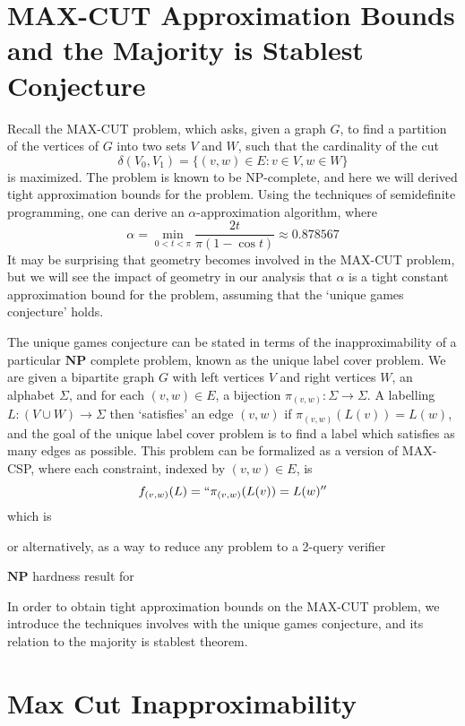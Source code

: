 \section{MAX-CUT Approximation Bounds and the Majority is Stablest Conjecture}

Recall the MAX-CUT problem, which asks, given a graph $G$, to find a partition of the vertices of $G$ into two sets $V$ and $W$, such that the cardinality of the cut
%
\[ \delta(V_0,V_1) = \{ (v,w) \in E : v \in V, w \in W \} \]
%
is maximized. The problem is known to be NP-complete, and here we will derived tight approximation bounds for the problem. Using the techniques of semidefinite programming, one can derive an $\alpha$-approximation algorithm, where
%
\[ \alpha = \min_{0 < t < \pi} \frac{2t}{\pi (1 - \cos t)} \approx 0.878567 \]
%
It may be surprising that geometry becomes involved in the MAX-CUT problem, but we will see the impact of geometry in our analysis that $\alpha$ is a tight constant approximation bound for the problem, assuming that the `unique games conjecture' holds.

The unique games conjecture can be stated in terms of the inapproximability of a particular $\mathbf{NP}$ complete problem, known as the unique label cover problem. We are given a bipartite graph $G$ with left vertices $V$ and right vertices $W$, an alphabet $\Sigma$, and for each $(v,w) \in E$, a bijection $\pi_{(v,w)}: \Sigma \to \Sigma$. A labelling $L: (V \cup W) \to \Sigma$ then `satisfies' an edge $(v,w)$ if $\pi_{(v,w)}(L(v)) = L(w)$, and the goal of the unique label cover problem is to find a label which satisfies as many edges as possible. This problem can be formalized as a version of MAX-CSP, where each constraint, indexed by $(v,w) \in E$, is
%
\[ f_{(v,w)}(L) = ``\pi_{(v,w)}(L(v)) = L(w)'' \]
%
which is 

or alternatively, as a way to reduce any problem to a 2-query verifier

$\mathbf{NP}$ hardness result for 

In order to obtain tight approximation bounds on the MAX-CUT problem, we introduce the techniques involves with the unique games conjecture, and its relation to the majority is stablest theorem.

\section{Max Cut Inapproximability}

